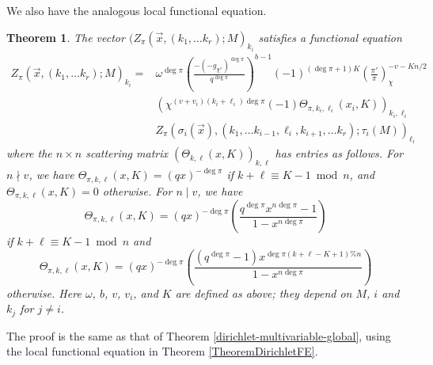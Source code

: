 \documentclass[11pt,letterpaper]{article}
\newtheorem{theorem}{Theorem}[section]
\theoremstyle{definition}
\theoremstyle{remark}
\numberwithin{equation}{section}
\theoremstyle{dotless}
\newcommand{\res}[2]{\left(\frac{#1}{#2}\right)}
\begin{document}
We also have the analogous local functional equation.

\begin{theorem} \label{dirichlet-multivariable-local}
The vector $(Z_\pi(\vec{x}, (k_1, \ldots k_r); M)_{k_i}$ satisfies a functional equation
\begin{equation}
\begin{split}
Z_\pi(\vec{x}, (k_1, \ldots k_r); M)_{k_i} =& \omega^{\deg \pi} \left(\frac{-(-g_{\chi^v})^{\deg \pi}}{q^{\deg \pi}}\right)^{b-1} (-1)^{(\deg \pi+1)K} \res{\pi'}{\pi}_\chi^{-v-Kn/2} \\
&(\chi^{(v+v_i)(k_i+\ell_i)\deg \pi}(-1) \Theta_{\pi, k_i, \ell_i}(x_i, K))_{k_i, \ell_i} \\
&Z_\pi(\sigma_i(\vec{x}), (k_1, \ldots k_{i-1}, \ell_i, k_{i+1}, \ldots k_r); \tau_i(M))_{\ell_i}
\end{split}
\end{equation}
where the $n\times n$ scattering matrix $(\Theta_{k, \ell}(x, K))_{k, \ell}$ has entries as follows. For $n \nmid v$, we have $\Theta_{\pi, k, \ell}(x, K)= (qx)^{-\deg \pi}$ if $k+\ell \equiv K-1 \bmod n$, and $\Theta_{\pi, k, \ell}(x, K)=0$ otherwise. 
For $n\mid v$, we have 
\begin{equation*}
\Theta_{\pi,k,\ell}(x, K)= (qx)^{-\deg \pi} \left(\frac{q^{\deg \pi}x^{n\deg \pi}-1}{1-x^{n\deg \pi}}\right)
\end{equation*}
if $k+\ell \equiv K-1 \bmod n$ and  
\begin{equation*}
\Theta_{\pi, k,\ell}(x, K)=  (qx)^{-\deg \pi} \left(\frac{(q^{\deg \pi}-1)x^{\deg \pi \left(k+\ell-K+1\right) \%n}}{1-x^{n\deg \pi}}\right)
\end{equation*}
otherwise. Here $\omega$, $b$, $v$, $v_i$, and $K$ are defined as above; they depend on $M$, $i$ and $k_j$ for $j \neq i$. 
\end{theorem}

The proof is the same as that of Theorem \ref{dirichlet-multivariable-global}, using the local functional equation in Theorem \ref{TheoremDirichletFE}.
\end{document}
